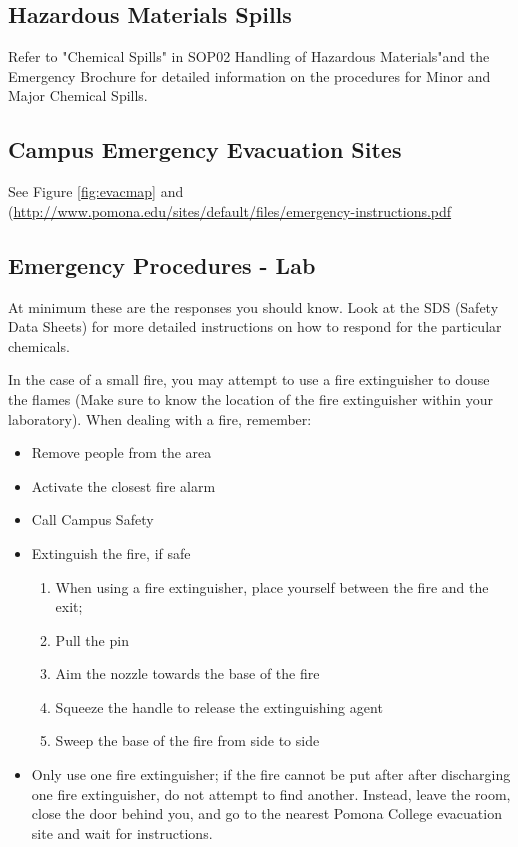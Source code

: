 \documentclass[12pt]{../SOP4_alpha}\usepackage[]{graphicx}\usepackage[]{xcolor}
\begin{document}
\subsection{Hazardous Materials Spills}

\NP Refer to "Chemical Spills" in SOP02 Handling of Hazardous Materials"and the Emergency Brochure for detailed information on the procedures for Minor and Major Chemical Spills.

\subsection{Campus Emergency Evacuation Sites}

See Figure \ref{fig:evacmap} and (\href{Pomona College Emergiency Instruction}{http://www.pomona.edu/sites/default/files/emergency-instructions.pdf}

\subsection*{Emergency Procedures - Lab}

\NP At minimum these are the responses you should know. Look at the SDS (Safety Data Sheets) for more detailed instructions on how to respond for the particular chemicals.  

\NP In the case of a small fire, you may attempt to use a fire extinguisher to douse the flames (Make sure to know the location of the fire extinguisher within your laboratory). 
When dealing with a fire, remember:

\begin{itemize}
  \item Remove people from the area
  \item Activate the closest fire alarm
  \item Call Campus Safety
  \item Extinguish the fire, if safe
    \begin{enumerate}
      \item When using a fire extinguisher, place yourself between the fire and the exit; 
	    \item Pull the pin
	    \item Aim the nozzle towards the base of the fire
	    \item Squeeze the handle to release the extinguishing agent
	    \item Sweep the base of the fire from side to side
    \end{enumerate}

  \item Only use one fire extinguisher; if the fire cannot be put after after discharging one fire extinguisher, do not attempt to find another. Instead, leave the room, close the door behind you, and go to the nearest Pomona College evacuation site and wait for instructions.
  
\end{itemize}
\end{document}
